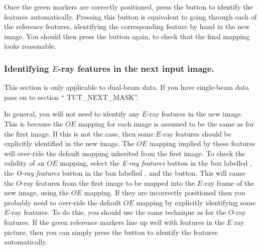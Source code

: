Once the green markers are correctly positioned, press the
 button to identify the features
automatically. Pressing this button is equivalent to going
through each of the reference features, identifying the corresponding
feature by hand in the new image. You should then press the  button again, to check that the final mapping
looks reasonable.

\subsubsection {Identifying $E$-ray features in the next input image.}
This section is only applicable to dual-beam data. If you have
single-beam data pass on to section ``
{TUT_NEXT_MASK}''.

In general, you will not need to identify any $E$-ray features in the new
image. This is because the $OE$ mapping for each image is assumed to be
the same as for the first image. If this is not the case, then some
$E$-ray features should be explicitly identified in the new image. The
$OE$ mapping implied by these features will over-ride the default mapping
inherited from the first image. To check the validity of an $OE$
mapping, select the {\em E-ray features} button in the box labelled
, the {\em O-ray features} button in
the box labelled , and the 
 button. This will cause
the $O$-ray features from the first image to be mapped into the $E$-ray
frame of the new image, using the $OE$ mapping. If they are incorrectly
positioned then you probably need to over-ride the default $OE$ mapping
by explicitly identifying some $E$-ray features. To do this, you should
use the same technique as for the $O$-ray features. If the green
reference markers line up well with features in the $E$ ray picture, then
you can simply press the  button to
identify the features automatically.

